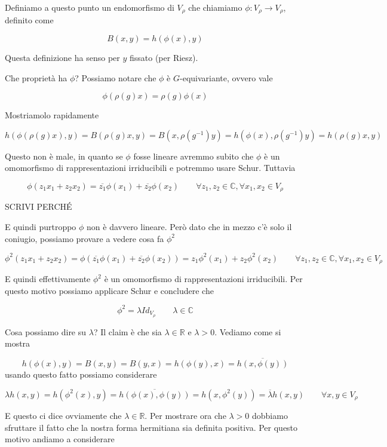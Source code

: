 \documentclass[11pt]{article}
\theoremstyle{plain}
\theoremstyle{definition}
\theoremstyle{remark}
\newcommand{\C}{\mathbb{C}}
\newcommand{\R}{\mathbb{R}}
\begin{document}
Definiamo a questo punto un endomorfismo di $V_\rho$ che chiamiamo $\phi: V_\rho \to V_\rho$, definito come


\[ B(x, y) = h(\phi(x), y)\] 

Questa definizione ha senso per $y$ fissato (per Riesz).

Che proprietà ha $\phi$? Possiamo notare che $\phi$ è $G$-equivariante, ovvero vale

\[ \phi(\rho(g)x) = \rho(g) \phi(x)\]

Mostriamolo rapidamente

\[ h(\phi(\rho(g)x) , y) = B(\rho(g)x, y) = B(x, \rho(g^{-1} ) y) = h (\phi(x), \rho(g^{-1} ) y) = h(\rho(g)x, y)\]

Questo non è male, in quanto se $\phi$ fosse lineare avremmo subito che $\phi$ è un omomorfismo di rappresentazioni irriducibili e potremmo usare Schur. Tuttavia

\[ \phi(z_1 x_1 + z_2 x_2) = \overline{z_1} \phi(x_1) + \overline{z_2} \phi(x_2) \qquad \forall z_1, z_2 \in \C, \forall x_1, x_2 \in V_\rho\]

SCRIVI PERCH\'E

E quindi purtroppo $\phi$ non è davvero lineare. Però dato che in mezzo c'è  solo il coniugio, possiamo provare a vedere cosa fa $\phi^2$

\[\phi^2(z_1 x_1 + z_2 x_2) = \phi(\overline{z_1} \phi(x_1) + \overline{z_2} \phi(x_2))  = z_1 \phi^2(x_1) + z_2 \phi^2(x_2) \qquad \forall z_1, z_2 \in \C, \forall x_1, x_2 \in V_\rho \] 


E quindi effettivamente $\phi^2$ è un omomorfismo di rappresentazioni irriducibili. Per questo motivo possiamo applicare Schur e concludere che 

\[ \phi^ 2 = \lambda Id_{V_\rho} \qquad \lambda \in \C\]


Cosa possiamo dire su $\lambda$? Il claim è che sia $\lambda \in \R$ e $\lambda > 0$. Vediamo come si mostra

\[h(\phi(x), y) = B(x, y) = B(y, x) = h(\phi(y), x) = \overline{h(x, \phi(y))} \]
usando questo fatto possiamo considerare 

\[ \lambda h(x, y) = h(\phi^2(x), y) = \overline{h(\phi(x), \phi(y))} = h(x, \phi^2(y)) = \overline{\lambda} h(x, y) \qquad \forall x, y \in V_\rho\]

E questo ci dice ovviamente che $\lambda \in \R$. Per mostrare ora che $\lambda > 0$ dobbiamo sfruttare il fatto che la nostra forma hermitiana sia definita positiva. Per questo motivo andiamo a considerare
\end{document}
